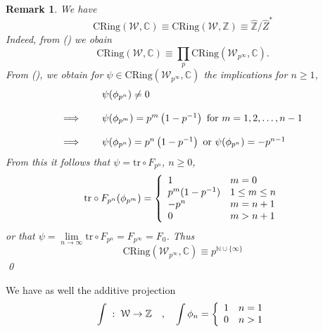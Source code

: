 \documentclass[leqno]{article}
\newcommand{\cring}{\text{CRing}}
\newcommand{\C}{\mathbb{C}}
\newcommand{\N}{\mathbb{N}}
\newcommand{\Z}{\mathbb{Z}}
\newtheorem{remark}[equation]{Remark}
\numberwithin{equation}{section}
\begin{document}
\begin{remark}
  We have
  \begin{equation*}
    \cring(\mathcal{W},\C) \equiv \cring(\mathcal{W},\Z)\equiv \hat{\Z}/\hat{Z}^*
  \end{equation*}
  Indeed, from () we obain
  \begin{equation*}
    \cring(\mathcal{W},\C)\equiv \prod_p\cring(\mathcal{W}_{p^\infty},\C). 
  \end{equation*}
  From (), we obtain for $\psi\in\cring(\mathcal{W}_{p^\infty},\C)$ the implications for $n\ge 1$,
  \begin{equation*}
    \begin{array}[h]{lll}
      \ & \ & \displaystyle \psi(\phi_{p^n})\not= 0 \\\\
      \displaystyle \Longrightarrow & \ & \psi(\phi_{p^m}) = p^m\left(1-p^{-1}\right) \text{ for $m=1,2,\ldots , n-1$} \\\\
      \displaystyle \Longrightarrow & \ & \psi(\phi_{p^n}) = p^n\left(1-p^{-1}\right) \text{ or $\psi(\phi_{p^n})=-p^{n-1}$} 
    \end{array}
  \end{equation*}
  From this it follows that $\psi=\text{tr}\circ F_{p^n}$,  $n\ge 0$,
  \begin{equation*}
    \text{tr}\circ F_{p^n}(\phi_{p^m})=
\left\{
    \begin{array}[h]{ll}
      1 & m=0 \\
      p^m(1-p^{-1}) & 1\le m \le n \\
      -p^n & m=n+1 \\
      0 & m>n+1
    \end{array}
    \right. 
  \end{equation*}
or that $\psi=\lim\limits_{n\to\infty} \text{tr}\circ F_{p^n} = F_{p^\infty}=F_0$. Thus
    \begin{equation*}
      \cring(\mathcal{W}_{p^\infty},\C) \equiv p^{\N\cup\{\infty\}}
\end{equation*}
\qed
\end{remark}
We have as well the additive projection
\begin{equation}
  \label{eq:12.31}
  \int \; : \; \mathcal{W}\rightarrow \Z \quad , \quad \int \phi_n=
\left\{  \begin{array}[h]{ll}
           1 & n=1 \\
           0 & n>1
\end{array}\right.
\end{equation}
\end{document}
